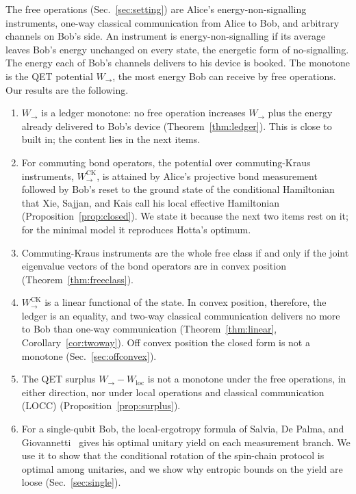 \documentclass[aps,pra,twocolumn,reprint,superscriptaddress,nofootinbib,floatfix]{revtex4-2}
\theoremstyle{plain}
\theoremstyle{remark}
\newcommand{\Wto}{W_{\to}}
\newcommand{\WCK}{W_{\to}^{\mathrm{CK}}}
\newcommand{\Wloc}{W_{\mathrm{loc}}}
\begin{document}
The free operations (Sec.~\ref{sec:setting}) are Alice's energy-non-signalling
instruments, one-way classical communication from Alice to Bob, and arbitrary channels on
Bob's side. An instrument is energy-non-signalling if its average leaves Bob's energy
unchanged on every state, the energetic form of no-signalling. The energy each of Bob's
channels delivers to his device is booked. The monotone is the QET potential $\Wto$, the
most energy Bob can receive by free operations. Our results are the following.
\begin{enumerate}\setlength{\itemsep}{1pt}\setlength{\parskip}{0pt}
\item $\Wto$ is a ledger monotone: no free operation increases $\Wto$ plus the energy
already delivered to Bob's device (Theorem~\ref{thm:ledger}). This is close to built in;
the content lies in the next items.
\item For commuting bond operators, the potential over commuting-Kraus instruments,
$\WCK$, is attained by Alice's projective bond measurement followed by Bob's reset to the
ground state of the conditional Hamiltonian that Xie, Sajjan, and Kais call his local
effective Hamiltonian~\cite{Xie2025} (Proposition~\ref{prop:closed}). We state it because
the next two items rest on it; for the minimal model it reproduces Hotta's optimum.
\item Commuting-Kraus instruments are the whole free class if and only if the joint
eigenvalue vectors of the bond operators are in convex position
(Theorem~\ref{thm:freeclass}).
\item $\WCK$ is a linear functional of the state. In convex position, therefore, the
ledger is an equality, and two-way classical communication delivers no more to Bob than
one-way communication (Theorem~\ref{thm:linear}, Corollary~\ref{cor:twoway}). Off convex
position the closed form is not a monotone (Sec.~\ref{sec:offconvex}).
\item The QET surplus $\Wto-\Wloc$ is not a monotone under the free operations, in either
direction, nor under local operations and classical communication (LOCC)
(Proposition~\ref{prop:surplus}).
\item For a single-qubit Bob, the local-ergotropy formula of Salvia, De Palma, and
Giovannetti~\cite{Salvia2023} gives his optimal unitary yield on each measurement branch.
We use it to show that the conditional rotation of the spin-chain protocol is optimal among
unitaries, and we show why entropic bounds on the yield are loose (Sec.~\ref{sec:single}).
\end{enumerate}
\end{document}
